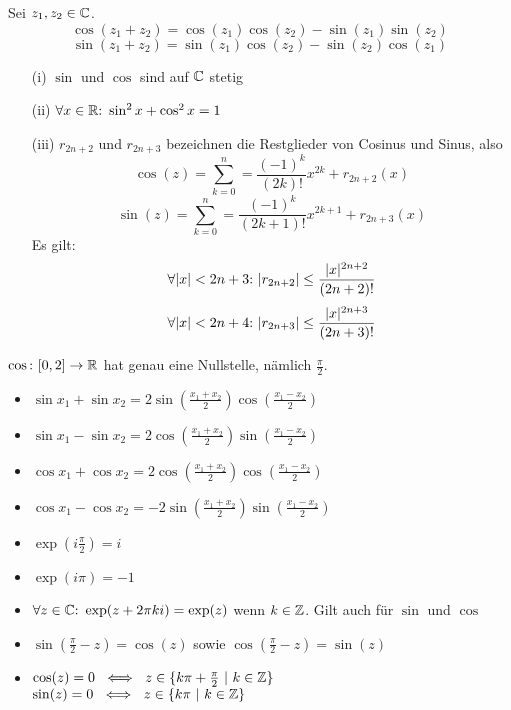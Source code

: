 \begin{framedthm}[Additionstheoreme]
	Sei $z_1,z_2 \in \mathbb{C}$.
	\[
	\cos(z_1 + z_2) = \cos(z_1)\cos(z_2) - \sin(z_1)\sin(z_2)
	\]
	\[
	\sin(z_1 + z_2) = \sin(z_1)\cos(z_2) - \sin(z_2)\cos(z_1)
	\]
\end{framedthm}

\begin{framedthm}
	\begin{enumerate}
		\item [(i)] $\sin$ und $\cos$ sind auf $\mathbb{C}$ stetig
		\item [(ii)] $\forall x \in \mathbb{R}{:}\  \sin^2 x + \cos^2 x = 1$
		\item [(iii)] $r_{2n+2}$ und $r_{2n+3}$ bezeichnen die Restglieder von Cosinus und Sinus, also 
		\[
		\cos(z) = \sum_{k=0}^{n} = \frac{(-1)^k}{(2k)!} x^{2k} + r_{2n+2}(x)
		\]
		\[
		\sin(z) = \sum_{k=0}^{n} = \frac{(-1)^k}{(2k + 1)!} x^{2k + 1} + r_{2n+3}(x)
		\]
		Es gilt:
		\[
		\forall |x| < 2n+3{:}\  |r_{2n+2}| \leq \frac{|x|^{2n+2}}{(2n+2)!}
		\]
		\[
		\forall |x| < 2n+4{:}\  |r_{2n+3}| \leq \frac{|x|^{2n+3}}{(2n+3)!}
		\]
	\end{enumerate}
\end{framedthm}

\begin{framedthm}
	$\cos{:}\  [0,2] \to \mathbb{R}$ hat genau eine Nullstelle, nämlich $\frac{\pi}{2}$.
\end{framedthm}

\begin{framedthm}
	\begin{itemize}
		\item $\sin x_1 + \sin x_2 = 2 \sin(\frac{x_1 + x_2}{2}) \cos(\frac{x_1 - x_2}{2})$
		\item $\sin x_1 - \sin x_2 = 2 \cos(\frac{x_1 + x_2}{2}) \sin(\frac{x_1 - x_2}{2})$
		\item $\cos x_1 + \cos x_2 = 2 \cos(\frac{x_1 + x_2}{2}) \cos(\frac{x_1 - x_2}{2})$
		\item $\cos x_1 - \cos x_2 = -2 \sin(\frac{x_1 + x_2}{2}) \sin(\frac{x_1 - x_2}{2})$
	\end{itemize}
\end{framedthm}

\begin{framedquest}
	\begin{itemize}
		\item $\exp(i\frac{\pi}{2}) = i$
		\item $\exp(i\pi) = -1$
		\item $\forall z \in \mathbb{C}{:}\  \exp(z + 2\pi k i) = \exp(z)$ wenn $k \in \mathbb{Z}$. Gilt auch für $\sin$ und $\cos$
		\item $\sin(\frac{\pi}{2} - z) = \cos(z)$ sowie $\cos(\frac{\pi}{2} - z) = \sin(z)$
		\item $\cos(z) = 0 \ \iff\ z \in \{k\pi + \frac{\pi}{2} \ |\ k \in \mathbb{Z}\}$\\ $\sin(z) = 0 \ \iff\ z \in \{k\pi \ |\ k \in \mathbb{Z}\}$
	\end{itemize}
\end{framedquest}

